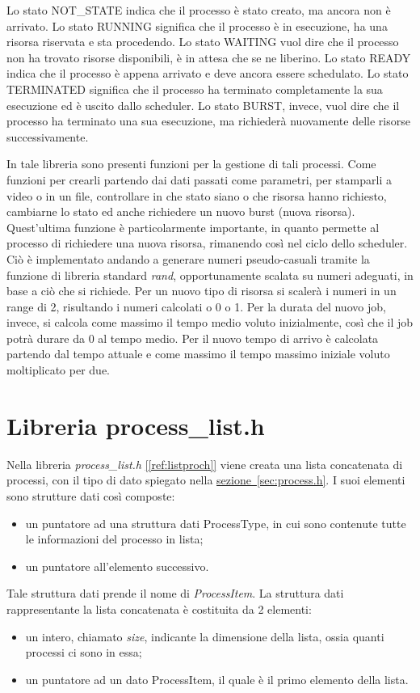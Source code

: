 \documentclass[Lau, oneside]{sapthesis}%
\begin{document}
Lo stato NOT\_STATE indica che il processo è stato creato, ma ancora non è arrivato.
Lo stato RUNNING significa che il processo è in esecuzione, ha una risorsa riservata e sta procedendo.
Lo stato WAITING vuol dire che il processo non ha trovato risorse disponibili, è in attesa che se ne liberino.
Lo stato READY indica che il processo è appena arrivato e deve ancora essere schedulato.
Lo stato TERMINATED significa che il processo ha terminato completamente la sua esecuzione ed è uscito dallo scheduler.
Lo stato BURST, invece, vuol dire che il processo ha terminato una sua esecuzione, ma richiederà nuovamente delle risorse successivamente.

In tale libreria sono presenti funzioni per la gestione di tali processi.
Come funzioni per crearli partendo dai dati passati come parametri, per stamparli a video o in un file, controllare in che stato siano o che risorsa hanno richiesto, cambiarne lo stato ed anche richiedere un nuovo burst (nuova risorsa).
Quest'ultima funzione è particolarmente importante, in quanto permette al processo di richiedere una nuova risorsa, rimanendo così nel ciclo dello scheduler.
Ciò è implementato andando a generare numeri pseudo-casuali tramite la funzione di libreria standard \textit{rand}, opportunamente scalata su numeri adeguati, in base a ciò che si richiede.
Per un nuovo tipo di risorsa si scalerà i numeri in un range di 2, risultando i numeri calcolati o 0 o 1.
Per la durata del nuovo job, invece, si calcola come massimo il tempo medio voluto inizialmente, così che il job potrà durare da 0 al tempo medio.
Per il nuovo tempo di arrivo è calcolata partendo dal tempo attuale e come massimo il tempo massimo iniziale voluto moltiplicato per due.

\section{Libreria process\_list.h}
\label{sec:procList.h}
Nella libreria \textit{process\_list.h} \hyperref[ref:listproch]{[\ref*{ref:listproch}]} viene creata una lista concatenata di processi, con il tipo di dato spiegato nella \hyperref[sec:process.h]{sezione~\ref*{sec:process.h}}.
I suoi elementi sono strutture dati così composte:
\begin{itemize}
    \item un puntatore ad una struttura dati ProcessType, in cui sono contenute tutte le informazioni del processo in lista;
    \item un puntatore all'elemento successivo.
\end{itemize}
Tale struttura dati prende il nome di \textit{ProcessItem}.
La struttura dati rappresentante la lista concatenata è costituita da 2 elementi:
\begin{itemize}
    \item un intero, chiamato \textit{size}, indicante la dimensione della lista, ossia quanti processi ci sono in essa;
    \item un puntatore ad un dato ProcessItem, il quale è il primo elemento della lista.
\end{itemize}
\end{document}
